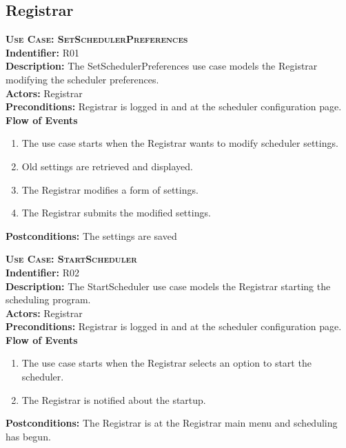 \documentclass[11pt]{article}
\newenvironment{usecase}{%
	\def\title##1{ {\large \bfseries  \scshape {Use Case:} ##1} \\ }
 	\def\id##1{{\bf Indentifier:} ##1\\}
	\def\des##1{ {\bf Description:} ##1\\}
	\def\actors##1{ {\bf Actors:} ##1\\}
    	\def\pre##1{ {\bf Preconditions:} ##1 \\} %
    	\def\flow##1{ {\bf Flow of Events} ##1}%
    	\newenvironment{ucenum}{%
        	\begin{enumerate}[nolistsep]\small}%
        	{\end{enumerate}}
	\def\post##1{ {\bf Postconditions:} ##1 \\}
}{\vspace{.05in}}
\begin{document}
\subsection{Registrar}
\begin{usecase}
  \title{SetSchedulerPreferences}
  \id{R01}
  \des{The SetSchedulerPreferences use case models the Registrar modifying the scheduler preferences.}
  \actors{Registrar}
  \pre{Registrar is logged in and at the scheduler configuration page.}
  \flow{}
  \begin{ucenum}
  \item The use case starts when the Registrar wants to modify scheduler settings.
  \item Old settings are retrieved and displayed.
  \item The Registrar modifies a form of settings.
  \item The Registrar submits the modified settings.
  \end{ucenum}
  \post{The settings are saved}
\end{usecase}

\begin{usecase}
  \title{StartScheduler}
  \id{R02}
  \des{The StartScheduler use case models the Registrar starting the scheduling program.}
  \actors{Registrar}
  \pre{Registrar is logged in and at the scheduler configuration page.}
  \flow{}
  \begin{ucenum}
  \item The use case starts when the Registrar selects an option to start the scheduler.
  \item The Registrar is notified about the startup.
  \end{ucenum}
  \post{The Registrar is at the Registrar main menu and scheduling has begun.}
\end{usecase}
\end{document}
